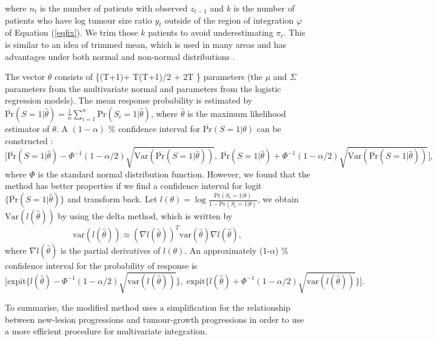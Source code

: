 \documentclass[10pt,A4]{article}
\begin{document}
where $n_t$ is the number of patients with observed $z_{t-1}$ and $k$ is the number of patients who have log tumour size ratio $y_t$ outside of the region of integration $\varphi$ of Equation (\ref{eqfix}). We trim those $k$ patients to avoid underestimating $\pi_t$. This is similar to an idea of trimmed mean, which is used in many areas and has advantages under both normal and non-normal distributions \cite{Stigler1973, Wilcox2005}.

The vector $\theta$ consists of \{(T+1)+ T(T+1)/2 + 2T \} parameters (the $\mu$ and $\Sigma$ parameters from the multivariate normal and parameters from the logistic regression models). The mean response probability is estimated by  $\overline{\text{Pr}}(S=1|\hat{\theta})=\frac{1}{n}\sum_{i=1}^{n}\text{Pr}(S_i=1|\hat{\theta})$, where $\hat{\theta}$ is the maximum likelihood estimator of $\theta$. A $(1-\alpha)$ \% confidence interval for $\overline{\text{Pr}}(S=1|\theta)$ can be constructed :
\[
\Bigg[\overline{\text{Pr}}(S=1|\hat{\theta})-\Phi^{-1}(1-\alpha/2)\sqrt{\text{Var}(\overline{\text{Pr}}(S=1|\hat{\theta}))} , \; \overline{\text{Pr}}(S=1|\hat{\theta})+\Phi^{-1}(1-\alpha/2)\sqrt{\text{Var}(\overline{\text{Pr}}(S=1|\hat{\theta}))}\Bigg],
\]
where $\Phi$ is the standard normal distribution function. However, we found that the method has better properties if we find a confidence interval for logit$\{\overline{\text{Pr}}(S=1|\hat{\theta})\}$ and transform back. Let $l(\theta)=\log \frac{\text{Pr}(S_i=1|\theta)}{1-\text{Pr}(S_i=1|\theta)}$, we obtain $\text{Var}(l(\hat{\theta}))$ by using the delta method, which is written by
\[
\text{var}(l(\hat{\theta})) \approx (\nabla l(\hat{\theta}))^T \text{var}(\hat{\theta}) \nabla l(\hat{\theta}),
\]
where $\nabla l(\hat{\theta})$ is the partial derivatives of $l(\theta)$. An approximately (1-$\alpha$) \%  confidence interval for the probability of response is
\[
\Bigg[\text{expit}\bigg\{l(\hat{\theta}) - \Phi^{-1}(1-\alpha/2)\sqrt{\text{var}(l(\hat{\theta}))}\bigg\}, \; \text{expit}\bigg\{l(\hat{\theta})+ \Phi^{-1}(1-\alpha/2)\sqrt{\text{var}(l(\hat{\theta}))}\bigg\}\Bigg].
\]

To summarise, the modified method uses a simplification for the relationship between new-lesion progressions and tumour-growth progressions in order to use a more efficient procedure for multivariate integration.
\end{document}
